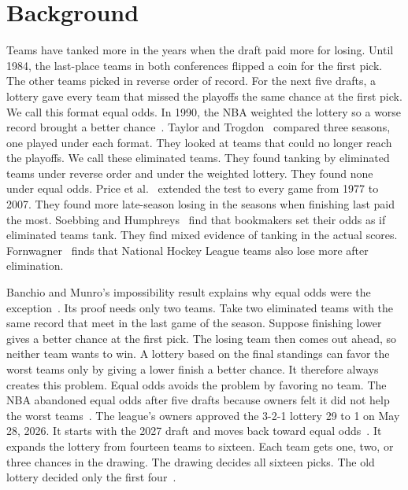 \documentclass[11pt,letterpaper]{article}
\begin{document}
\section{Background}

Teams have tanked more in the years when the draft paid more for losing. Until 1984, the last-place teams in both conferences flipped a coin for the first pick. The other teams picked in reverse order of record. For the next five drafts, a lottery gave every team that missed the playoffs the same chance at the first pick. We call this format equal odds. In 1990, the NBA weighted the lottery so a worse record brought a better chance~\cite{munro2020notanking}. Taylor and Trogdon~\cite{taylor2002losing} compared three seasons, one played under each format. They looked at teams that could no longer reach the playoffs. We call these eliminated teams. They found tanking by eliminated teams under reverse order and under the weighted lottery. They found none under equal odds. Price et al.~\cite{price2010tournament} extended the test to every game from 1977 to 2007. They found more late-season losing in the seasons when finishing last paid the most. Soebbing and Humphreys~\cite{soebbing2013gamblers} find that bookmakers set their odds as if eliminated teams tank. They find mixed evidence of tanking in the actual scores. Fornwagner~\cite{fornwagner2019incentives} finds that National Hockey League teams also lose more after elimination.

Banchio and Munro's impossibility result explains why equal odds were the exception~\cite{munro2020notanking}. Its proof needs only two teams. Take two eliminated teams with the same record that meet in the last game of the season. Suppose finishing lower gives a better chance at the first pick. The losing team then comes out ahead, so neither team wants to win. A lottery based on the final standings can favor the worst teams only by giving a lower finish a better chance. It therefore always creates this problem. Equal odds avoids the problem by favoring no team. The NBA abandoned equal odds after five drafts because owners felt it did not help the worst teams~\cite{soebbing2013gamblers}. The league's owners approved the 3-2-1 lottery 29 to 1 on May 28, 2026. It starts with the 2027 draft and moves back toward equal odds~\cite{bontemps2026lottery}. It expands the lottery from fourteen teams to sixteen. Each team gets one, two, or three chances in the drawing. The drawing decides all sixteen picks. The old lottery decided only the first four~\cite{oconnor2026lottery}.
\end{document}
